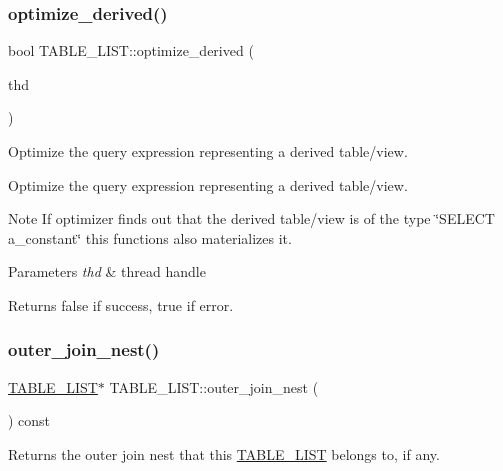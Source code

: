 \subsubsection{\texorpdfstring{optimize\+\_\+derived()}{optimize\_derived()}}
{\footnotesize\ttfamily bool T\+A\+B\+L\+E\+\_\+\+L\+I\+S\+T\+::optimize\+\_\+derived (\begin{DoxyParamCaption}\item[{T\+HD $\ast$}]{thd }\end{DoxyParamCaption})}



Optimize the query expression representing a derived table/view. 

Optimize the query expression representing a derived table/view.

\begin{DoxyNote}{Note}
If optimizer finds out that the derived table/view is of the type \char`\"{}\+S\+E\+L\+E\+C\+T a\+\_\+constant\char`\"{} this functions also materializes it.
\end{DoxyNote}

\begin{DoxyParams}{Parameters}
{\em thd} & thread handle\\
\hline
\end{DoxyParams}
\begin{DoxyReturn}{Returns}
false if success, true if error. 
\end{DoxyReturn}
\mbox{\label{structTABLE__LIST_a085cc51038dc667dd6a711be20d3ff2b}} 
\subsubsection{\texorpdfstring{outer\+\_\+join\+\_\+nest()}{outer\_join\_nest()}}
{\footnotesize\ttfamily \mbox{\hyperlink{structTABLE__LIST}{T\+A\+B\+L\+E\+\_\+\+L\+I\+ST}}$\ast$ T\+A\+B\+L\+E\+\_\+\+L\+I\+S\+T\+::outer\+\_\+join\+\_\+nest (\begin{DoxyParamCaption}{ }\end{DoxyParamCaption}) const\hspace{0.3cm}{\ttfamily [inline]}}



Returns the outer join nest that this \mbox{\hyperlink{structTABLE__LIST}{T\+A\+B\+L\+E\+\_\+\+L\+I\+ST}} belongs to, if any. 

